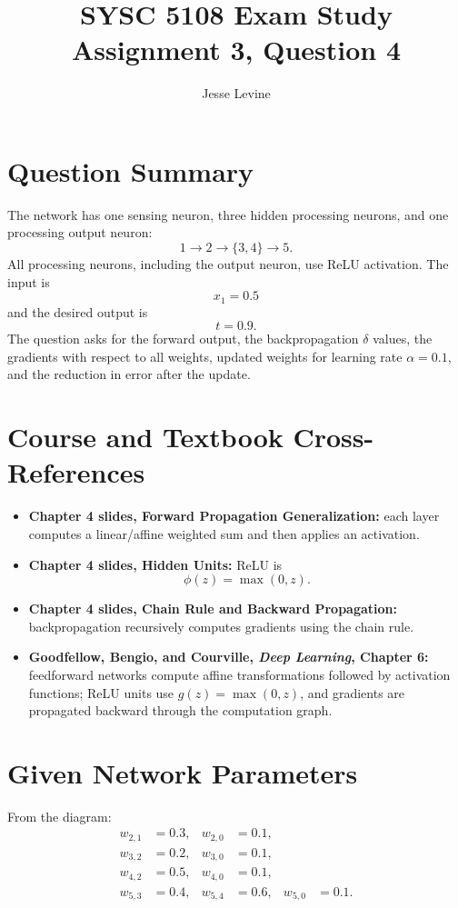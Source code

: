 \documentclass[11pt]{article}
\title{SYSC 5108 Exam Study\\Assignment 3, Question 4}
\author{Jesse Levine}
\date{}
\begin{document}
\maketitle

\section*{Question Summary}

The network has one sensing neuron, three hidden processing neurons, and one
processing output neuron:
\[
    1 \rightarrow 2 \rightarrow \{3,4\} \rightarrow 5.
\]
All processing neurons, including the output neuron, use ReLU activation. The
input is
\[
    x_1 = 0.5
\]
and the desired output is
\[
    t = 0.9.
\]
The question asks for the forward output, the backpropagation \(\delta\) values,
the gradients with respect to all weights, updated weights for learning rate
\(\alpha=0.1\), and the reduction in error after the update.

\section*{Course and Textbook Cross-References}

\begin{itemize}
    \item \textbf{Chapter 4 slides, Forward Propagation Generalization:} each
    layer computes a linear/affine weighted sum and then applies an activation.
    \item \textbf{Chapter 4 slides, Hidden Units:} ReLU is
    \[
        \phi(z)=\max(0,z).
    \]
    \item \textbf{Chapter 4 slides, Chain Rule and Backward Propagation:}
    backpropagation recursively computes gradients using the chain rule.
    \item \textbf{Goodfellow, Bengio, and Courville, \emph{Deep Learning},
    Chapter 6:} feedforward networks compute affine transformations followed by
    activation functions; ReLU units use \(g(z)=\max(0,z)\), and gradients are
    propagated backward through the computation graph.
\end{itemize}

\section*{Given Network Parameters}

From the diagram:
\[
\begin{aligned}
    w_{2,1}&=0.3, & w_{2,0}&=0.1, \\
    w_{3,2}&=0.2, & w_{3,0}&=0.1, \\
    w_{4,2}&=0.5, & w_{4,0}&=0.1, \\
    w_{5,3}&=0.4, & w_{5,4}&=0.6, & w_{5,0}&=0.1.
\end{aligned}
\]
\end{document}

